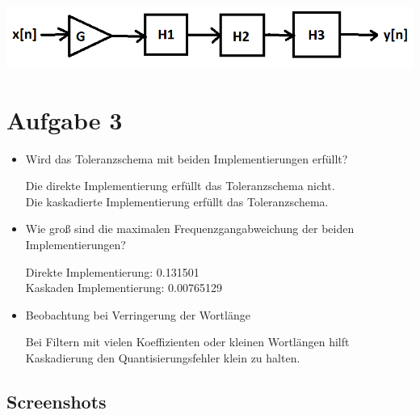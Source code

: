 \begin{center}
\includegraphics[scale=0.92]{UE02_2_Blockschaltbild.png}
\end{center}

\newpage

\section{Aufgabe 3}

\begin{itemize}
\item Wird das Toleranzschema mit beiden Implementierungen erfüllt?

Die direkte Implementierung erfüllt das Toleranzschema nicht.\\
Die kaskadierte Implementierung erfüllt das Toleranzschema.
\newline
\item Wie groß sind die maximalen Frequenzgangabweichung der beiden Implementierungen?

Direkte Implementierung: 0.131501\\
Kaskaden Implementierung: 0.00765129
\newline
\item Beobachtung bei Verringerung der Wortlänge

Bei Filtern mit vielen Koeffizienten oder kleinen Wortlängen hilft Kaskadierung den Quantisierungsfehler klein zu halten.
\end{itemize}

\newpage

\subsection{Screenshots}

